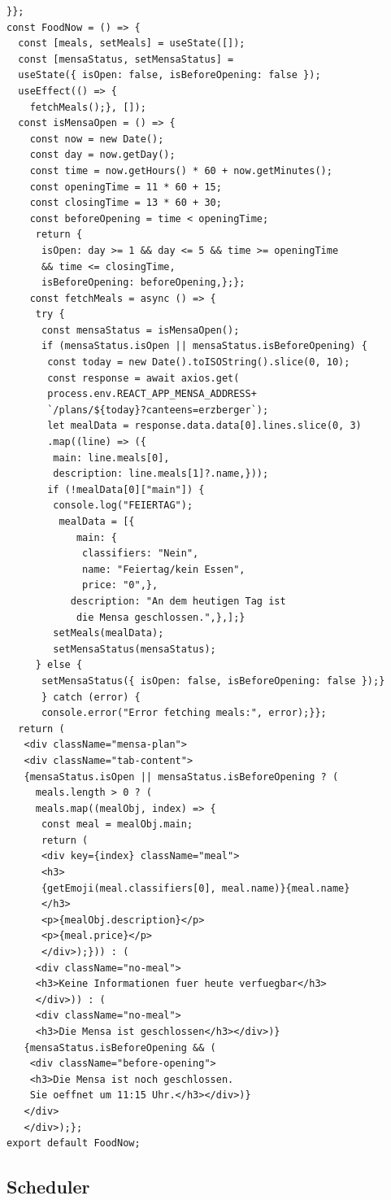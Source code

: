 \begin{lstlisting}
}};
const FoodNow = () => {
  const [meals, setMeals] = useState([]);
  const [mensaStatus, setMensaStatus] = 
  useState({ isOpen: false, isBeforeOpening: false });
  useEffect(() => {
    fetchMeals();}, []);
  const isMensaOpen = () => {
  	const now = new Date();
  	const day = now.getDay();
  	const time = now.getHours() * 60 + now.getMinutes();
  	const openingTime = 11 * 60 + 15;
  	const closingTime = 13 * 60 + 30;
  	const beforeOpening = time < openingTime;
  	 return {
  	  isOpen: day >= 1 && day <= 5 && time >= openingTime 
  	  && time <= closingTime,
  	  isBeforeOpening: beforeOpening,};};
    const fetchMeals = async () => {
     try {
      const mensaStatus = isMensaOpen();
      if (mensaStatus.isOpen || mensaStatus.isBeforeOpening) {
       const today = new Date().toISOString().slice(0, 10);
       const response = await axios.get(
       process.env.REACT_APP_MENSA_ADDRESS+
       `/plans/${today}?canteens=erzberger`);
       let mealData = response.data.data[0].lines.slice(0, 3)
       .map((line) => ({
       	main: line.meals[0],
       	description: line.meals[1]?.name,}));
       if (!mealData[0]["main"]) {
        console.log("FEIERTAG");
         mealData = [{
         	main: {
             classifiers: "Nein",
             name: "Feiertag/kein Essen",
             price: "0",},
           description: "An dem heutigen Tag ist
            die Mensa geschlossen.",},];}
        setMeals(mealData);
        setMensaStatus(mensaStatus);
     } else {
      setMensaStatus({ isOpen: false, isBeforeOpening: false });}
      } catch (error) {
      console.error("Error fetching meals:", error);}};
  return (
   <div className="mensa-plan">
   <div className="tab-content">
   {mensaStatus.isOpen || mensaStatus.isBeforeOpening ? (
   	 meals.length > 0 ? (
   	 meals.map((mealObj, index) => {
   	  const meal = mealObj.main;
   	  return (
   	  <div key={index} className="meal">
   	  <h3>
   	  {getEmoji(meal.classifiers[0], meal.name)}{meal.name}
   	  </h3>
   	  <p>{mealObj.description}</p>
   	  <p>{meal.price}</p>
   	  </div>);})) : (
     <div className="no-meal">
     <h3>Keine Informationen fuer heute verfuegbar</h3>
     </div>)) : (
     <div className="no-meal">
     <h3>Die Mensa ist geschlossen</h3></div>)}
   {mensaStatus.isBeforeOpening && (
   	<div className="before-opening">
   	<h3>Die Mensa ist noch geschlossen. 
   	Sie oeffnet um 11:15 Uhr.</h3></div>)}
   </div>
   </div>);};
export default FoodNow;

\end{lstlisting}
\newpage
\subsection{Scheduler}
